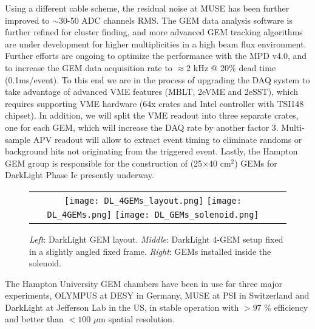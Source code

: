 \documentclass{PoS}
\begin{document}
Using a different cable scheme, the residual noise at MUSE has been further
improved to $\sim$30-50 ADC channels RMS. The GEM data analysis software is
further refined for cluster finding, and more advanced GEM tracking
algorithms are under development for higher multiplicities in a high beam
flux environment.   
Further efforts are ongoing to optimize the performance with the MPD v4.0,
and to increase the GEM data acquisition rate to $\approx$2 kHz @ 20$\%$ dead
time (0.1ms/event). %
To this end we are in the process of upgrading the DAQ system to take
advantage of advanced VME features (MBLT, 2eVME and 2eSST), which requires
supporting VME hardware (64x crates and Intel controller with TSI148 chipset).
In addition, we will split the VME readout into three separate crates, one
for each GEM, which will increase the DAQ rate by another factor 3.
Multi-sample APV readout will allow to extract event timing to eliminate randoms
or background hits not originating from the triggered event.
Lastly, the Hampton GEM group is responsible for the construction of
(25$\times$40 cm$^2$) GEMs for DarkLight Phase Ic presently underway.
\begin{figure}[t] %
\centering
\begin{tabular}{cc}
\mbox{\texttt{[image: DL\_4GEMs\_layout.png]}}
\mbox{\texttt{[image: DL\_4GEMs.png]}}
\mbox{\texttt{[image: DL\_GEMs\_solenoid.png]}}
\end{tabular}
\caption{\emph{Left}: DarkLight GEM layout.
  \emph{Middle}: DarkLight 4-GEM setup fixed in a slightly angled fixed frame.
  \emph{Right}: GEMs installed inside the solenoid.} 
\label{DLGEMs} 
\end{figure}


The Hampton University GEM chambers have been in use for three major
experiments, OLYMPUS at DESY in Germany, MUSE at PSI in Switzerland and
DarkLight at Jefferson Lab in the US, in stable operation
with $>97$ \% efficiency and better than $< 100$ $\mu$m spatial resolution. 
\end{document}
